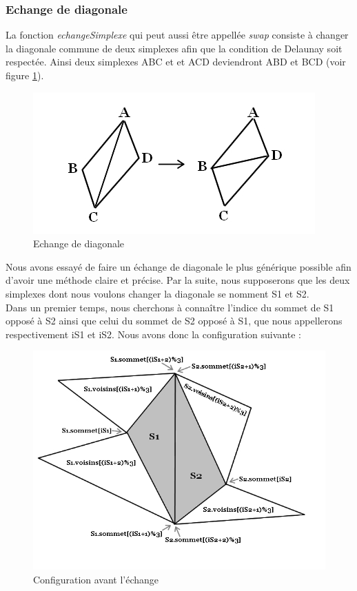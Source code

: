 \documentclass{article}
\begin{document}
       \subsubsection{Echange de diagonale}
       \label{echangeDiagonale}
        La fonction \textit{echangeSimplexe} qui peut aussi être appellée \textit{swap} consiste à changer la diagonale commune de deux simplexes afin que la condition de Delaunay soit respectée. Ainsi deux simplexes ABC et et ACD deviendront ABD et BCD (voir figure \ref{fig1}).
        
        \begin{figure}[H]
            \centering
            \includegraphics[scale=0.40]{exemple_swap_simple.jpg}     
            \caption{Echange de diagonale}
            \label{fig1}
        \end{figure}
        
        Nous avons essayé de faire un échange de diagonale le plus générique possible afin d'avoir une méthode claire et précise. Par la suite, nous supposerons que les deux simplexes dont nous voulons changer la diagonale se nomment S1 et S2.
        \\ Dans un premier temps, nous cherchons à connaître l'indice du sommet de S1 opposé à S2 ainsi que celui du sommet de S2 opposé à S1, que nous appellerons respectivement iS1 et iS2. Nous avons donc la configuration suivante : 
        
        \begin{figure}[H]
            \centering
            \includegraphics[scale=0.40]{config_avant_swap.jpg}     
            \caption{Configuration avant l'échange}
        \end{figure}
        
\end{document}
